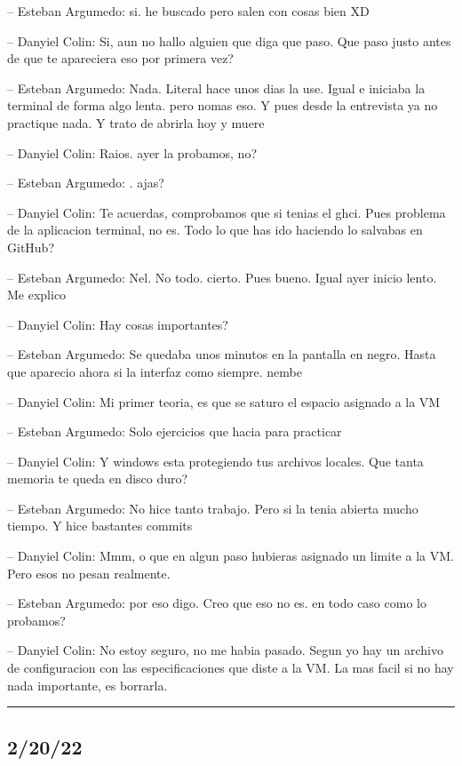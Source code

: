-- Esteban Argumedo: si. he buscado pero salen con cosas bien XD

-- Danyiel Colin: Si, aun no hallo alguien que diga que paso. Que paso
justo antes de que te apareciera eso por primera vez?

-- Esteban Argumedo: Nada. Literal hace unos dias la use. Igual e
iniciaba la terminal de forma algo lenta. pero nomas eso. Y pues desde
la entrevista ya no practique nada. Y trato de abrirla hoy y muere

-- Danyiel Colin: Raios. ayer la probamos, no?

-- Esteban Argumedo: . ajas?

-- Danyiel Colin: Te acuerdas, comprobamos que si tenias el ghci. Pues
problema de la aplicacion terminal, no es. Todo lo que has ido haciendo
lo salvabas en GitHub?

-- Esteban Argumedo: Nel. No todo. cierto. Pues bueno. Igual ayer inicio
lento. Me explico

-- Danyiel Colin: Hay cosas importantes?

-- Esteban Argumedo: Se quedaba unos minutos en la pantalla en negro.
Hasta que aparecio ahora si la interfaz como siempre. nembe

-- Danyiel Colin: Mi primer teoria, es que se saturo el espacio asignado
a la VM

-- Esteban Argumedo: Solo ejercicios que hacia para practicar

-- Danyiel Colin: Y windows esta protegiendo tus archivos locales. Que
tanta memoria te queda en disco duro?

-- Esteban Argumedo: No hice tanto trabajo. Pero si la tenia abierta
mucho tiempo. Y hice bastantes commits

-- Danyiel Colin: Mmm, o que en algun paso hubieras asignado un limite a
la VM. Pero esos no pesan realmente.

-- Esteban Argumedo: por eso digo. Creo que eso no es. en todo caso como
lo probamos?

-- Danyiel Colin: No estoy seguro, no me habia pasado. Segun yo hay un
archivo de configuracion con las especificaciones que diste a la VM. La
mas facil si no hay nada importante, es borrarla.

\begin{center}\rule{0.5\linewidth}{0.5pt}\end{center}

\hypertarget{section-12}{%
\subsection{2/20/22}\label{section-12}}

